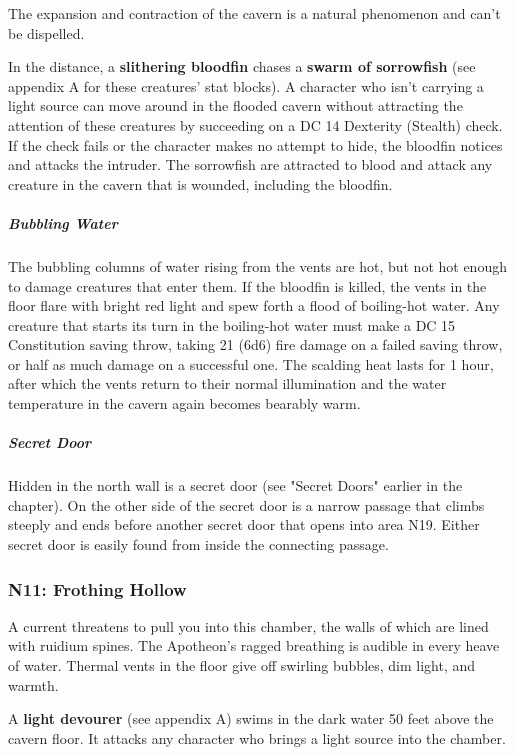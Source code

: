 \documentclass[10pt,a4paper,twoside,fancy,bg=print,twocolumn,openany,nodeprecatedcode]{dndbook}
\begin{document}
The expansion and contraction of the cavern is a natural phenomenon and can't be dispelled.

In the distance, a \textbf{slithering bloodfin} chases a \textbf{swarm of sorrowfish} (see appendix A for these creatures' stat blocks). A character who isn't carrying a light source can move around in the flooded cavern without attracting the attention of these creatures by succeeding on a DC 14 Dexterity (Stealth) check. If the check fails or the character makes no attempt to hide, the bloodfin notices and attacks the intruder. The sorrowfish are attracted to blood and attack any creature in the cavern that is wounded, including the bloodfin.

\subparagraph{Bubbling Water}
The bubbling columns of water rising from the vents are hot, but not hot enough to damage creatures that enter them. If the bloodfin is killed, the vents in the floor flare with bright red light and spew forth a flood of boiling-hot water. Any creature that starts its turn in the boiling-hot water must make a DC 15 Constitution saving throw, taking 21 (6d6) fire damage on a failed saving throw, or half as much damage on a successful one. The scalding heat lasts for 1 hour, after which the vents return to their normal illumination and the water temperature in the cavern again becomes bearably warm.

\subparagraph{Secret Door}
Hidden in the north wall is a secret door (see "Secret Doors" earlier in the chapter). On the other side of the secret door is a narrow passage that climbs steeply and ends before another secret door that opens into area N19. Either secret door is easily found from inside the connecting passage.

\subsubsection{N11: Frothing Hollow}
\begin{DndReadAloud}{}
A current threatens to pull you into this chamber, the walls of which are lined with ruidium spines. The Apotheon's ragged breathing is audible in every heave of water. Thermal vents in the floor give off swirling bubbles, dim light, and warmth.

\end{DndReadAloud}

A \textbf{light devourer} (see appendix A) swims in the dark water 50 feet above the cavern floor. It attacks any character who brings a light source into the chamber.
\end{document}

